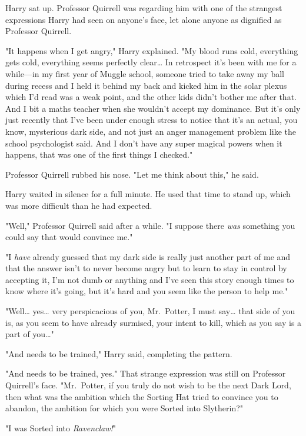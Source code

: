 Harry sat up. Professor Quirrell was regarding him with one of the strangest
expressions Harry had seen on anyone's face, let alone anyone as dignified as
Professor Quirrell.

"It happens when I get angry," Harry explained. "My blood runs cold, everything
gets cold, everything seems perfectly clear{\ldots} In retrospect it's been
with me for a while---in my first year of Muggle school, someone tried to take
away my ball during recess and I held it behind my back and kicked him in the
solar plexus which I'd read was a weak point, and the other kids didn't bother
me after that. And I bit a maths teacher when she wouldn't accept my dominance.
But it's only just recently that I've been under enough stress to notice that
it's an actual, you know, mysterious dark side, and not just an anger
management problem like the school psychologist said. And I don't have any
super magical powers when it happens, that was one of the first things I
checked."

Professor Quirrell rubbed his nose. "Let me think about this," he said.

Harry waited in silence for a full minute. He used that time to stand up, which
was more difficult than he had expected.

"Well," Professor Quirrell said after a while. "I suppose there \emph{was}
something you could say that would convince me."

"I \emph{have} already guessed that my dark side is really just another part of
me and that the answer isn't to never become angry but to learn to stay in
control by accepting it, I'm not dumb or anything and I've seen this story
enough times to know where it's going, but it's hard and you seem like the
person to help me."

"Well{\ldots} yes{\ldots} very perspicacious of you, Mr.~Potter, I must
say{\ldots} that side of you is, as you seem to have already surmised, your
intent to kill, which as you say is a part of you{\ldots}"

"And needs to be trained," Harry said, completing the pattern.

"And needs to be trained, yes." That strange expression was still on Professor
Quirrell's face. "Mr.~Potter, if you truly do not wish to be the next Dark
Lord, then what was the ambition which the Sorting Hat tried to convince you to
abandon, the ambition for which you were Sorted into Slytherin?"

"I was Sorted into \emph{Ravenclaw!}"

